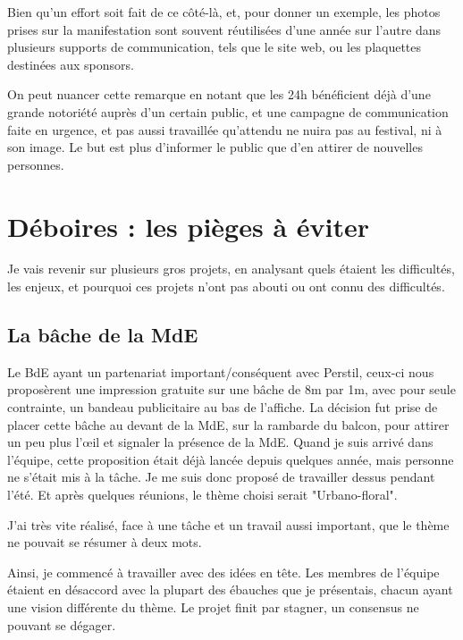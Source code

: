         Bien qu'un effort soit fait de ce côté-là, et, pour donner un exemple, les photos prises sur la manifestation sont souvent réutilisées d'une année sur l'autre dans plusieurs supports de communication, tels que le site web, ou les plaquettes destinées aux sponsors.
        
        On peut nuancer cette remarque en notant que les 24h bénéficient déjà d'une grande notoriété auprès d'un certain public, et une campagne de communication faite en urgence, et pas aussi travaillée qu'attendu ne nuira pas au festival, ni à son image. Le but est plus d'informer le public que d'en attirer de nouvelles personnes.
    
\section{Déboires : les pièges à éviter}

    Je vais revenir sur plusieurs gros projets, en analysant quels étaient les difficultés, les enjeux, et pourquoi ces projets n'ont pas abouti ou ont connu des difficultés.
    
    \subsection{La bâche de la MdE}
    
        Le BdE ayant un partenariat important/conséquent avec Perstil, ceux-ci nous proposèrent une impression gratuite sur une bâche de 8m par 1m, avec pour seule contrainte, un bandeau publicitaire au bas de l'affiche. 
        La décision fut prise de placer cette bâche au devant de la MdE, sur la rambarde du balcon, pour attirer un peu plus l'œil et signaler la présence de la MdE.
        Quand je suis arrivé dans l'équipe, cette proposition était déjà lancée depuis quelques année, mais personne ne s'était mis à la tâche.
        Je me suis donc proposé de travailler dessus pendant l'été. Et après quelques réunions, le thème choisi serait "Urbano-floral".
        
        J'ai très vite réalisé, face à une tâche et un travail aussi important, que le thème ne pouvait se résumer à deux mots.
        
        Ainsi, je commencé à travailler avec des idées en tête. Les membres de l'équipe étaient en désaccord avec la plupart des ébauches que je présentais, chacun ayant une vision différente du thème. Le projet finit par stagner, un consensus ne pouvant se dégager.
        
